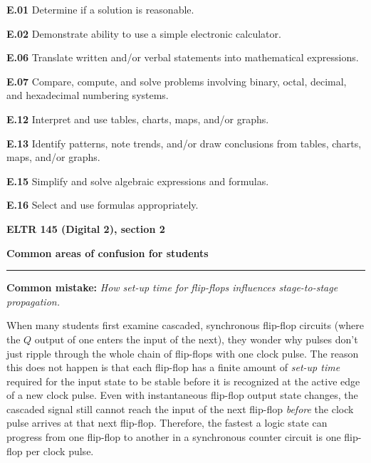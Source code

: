 \item{\bf E.01} Determine if a solution is reasonable.
\item{\bf E.02} Demonstrate ability to use a simple electronic calculator.
\item{\bf E.06} Translate written and/or verbal statements into mathematical expressions.
\item{\bf E.07} Compare, compute, and solve problems involving binary, octal, decimal, and hexadecimal numbering systems.
\item{\bf E.12} Interpret and use tables, charts, maps, and/or graphs.
\item{\bf E.13} Identify patterns, note trends, and/or draw conclusions from tables, charts, maps, and/or graphs.
\item{\bf E.15} Simplify and solve algebraic expressions and formulas.
\item{\bf E.16} Select and use formulas appropriately.
\medskip





\vfil \eject

\centerline{\bf ELTR 145 (Digital 2), section 2} \bigskip 
 
\vskip 10pt

\noindent
{\bf Common areas of confusion for students}

\vskip 5pt

\hrule \vskip 5pt

\vskip 10pt

\noindent
{\bf Common mistake: } {\it How set-up time for flip-flops influences stage-to-stage propagation.}

When many students first examine cascaded, synchronous flip-flop circuits (where the $Q$ output of one enters the input of the next), they wonder why pulses don't just ripple through the whole chain of flip-flops with one clock pulse.  The reason this does not happen is that each flip-flop has a finite amount of {\it set-up time} required for the input state to be stable before it is recognized at the active edge of a new clock pulse.  Even with instantaneous flip-flop output state changes, the cascaded signal still cannot reach the input of the next flip-flop {\it before} the clock pulse arrives at that next flip-flop.  Therefore, the fastest a logic state can progress from one flip-flop to another in a synchronous counter circuit is one flip-flop per clock pulse.



